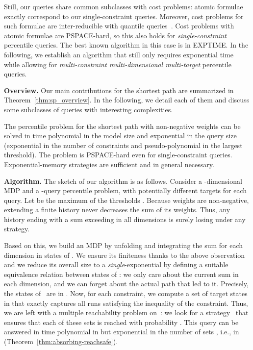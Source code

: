 \documentclass{llncs}
\newcommand\PSPACE{\textrm{\sf PSPACE}}
\newcommand\EXPTIME{\textrm{\sf EXPTIME}}
\begin{document}
Still, our queries share common subclasses with cost problems: atomic formulae~ exactly correspond to our single-constraint queries. Moreover, cost problems for such formulae are inter-reducible with quantile queries~\cite[Proposition 2]{HaaseK14}. Cost problems with atomic formulae are \PSPACE-hard, so this also holds for \textit{single-constraint} percentile queries. The best known algorithm in this case is in \EXPTIME. In the following, we establish an algorithm that still only requires exponential time while allowing for \textit{multi-constraint multi-dimensional multi-target} percentile queries.

\smallskip\noindent\textbf{Overview.} 
Our main contributions for the shortest path are summarized in Theorem~\ref{thm:sp_overview}. In the following, we detail each of them and discuss some subclasses of queries with interesting complexities.

\begin{theorem}
\label{thm:sp_overview}
The percentile problem for the shortest path with non-negative weights can be solved in time polynomial in the model size
and exponential in the query size (exponential in the number of constraints and pseudo-polynomial in the largest threshold). 
The problem is \PSPACE-hard even for single-constraint queries. Exponential-memory strategies are sufficient and in general necessary.
\end{theorem}

\smallskip\noindent\textbf{Algorithm.} The sketch of our algorithm is as follows. Consider a -dimensional MDP  and a -query percentile problem, with potentially different targets for each query. 
Let  be the maximum of the thresholds . Because weights are non-negative, extending a finite history never decreases the sum of its weights.
Thus, any history ending with a sum exceeding  in all dimensions is surely losing under any strategy.

Based on this, we build an MDP  by unfolding  and integrating the sum for each dimension in states of . We ensure its finiteness thanks to the above observation and we reduce its overall size to a \textit{single}-exponential by defining a suitable equivalence relation between states of : we only care about the current sum in each dimension, and we can forget about the actual path that led to it. Precisely, 
the states of~ are in . 
Now, for each constraint, we compute a set of target states in  that exactly captures all runs satisfying the inequality of the constraint. Thus, we are left with a multiple reachability problem on~: we look for a strategy~ that ensures that each of these sets  is reached with probability . This query can be answered in time polynomial in  but exponential in the number of sets , i.e., in  (Theorem~\ref{thm:absorbing-reachsafe}). 
\end{document}
